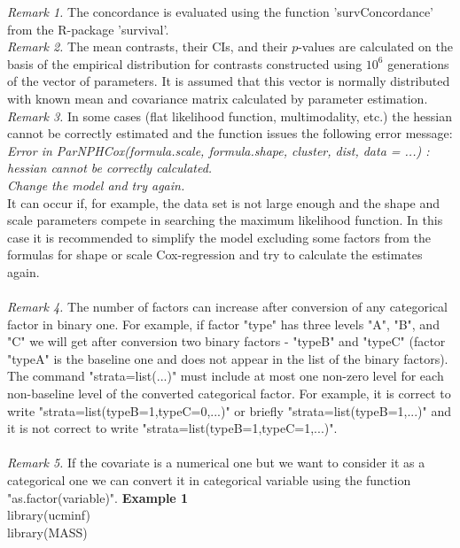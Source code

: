 \documentclass[A4document,12pt]{article}\usepackage[]{graphicx}\usepackage[]{color}
\begin{document}
\noindent
{\it{Remark 1.}} The concordance is evaluated using the function 'survConcordance' from the R-package 'survival'.\\
\noindent
{\it{Remark 2.}} The mean contrasts, their CIs, and their $p$-values are calculated on the basis of the empirical distribution for contrasts constructed using $10^6$ generations of the vector of parameters. It is assumed that this vector is normally distributed with known mean and covariance matrix calculated by parameter estimation. \\
\noindent
{\it{Remark 3.}} In some cases (flat likelihood function, multimodality, etc.) the hessian cannot be correctly estimated and the function issues the following error message: \\
{\it {Error in ParNPHCox(formula.scale, formula.shape, cluster, dist, data = ...) : \\
  hessian cannot be correctly calculated. \\
  Change the model and try again.}} \\
\noindent
It can occur if, for example, the data set is not large enough and the shape and scale parameters compete in searching the maximum likelihood function.  In this case it is recommended to simplify the model excluding some factors from the formulas for shape or scale Cox-regression and try to calculate the estimates again.\\\\
\noindent
{\it{Remark 4.}} The number of factors can increase after conversion of any categorical factor in binary one. For example, if factor "type" has three levels "A", "B", and "C" we will get after conversion two binary factors - "typeB" and "typeC" (factor "typeA" is the baseline one and does not appear in the list of the binary factors). The command "strata=list(...)" must include at most one non-zero level for each non-baseline level of the converted categorical factor. For example, it is correct to write "strata=list(typeB=1,typeC=0,...)" or briefly  "strata=list(typeB=1,...)"  and it is not correct to write "strata=list(typeB=1,typeC=1,...)".\\\\
\noindent
{\it{Remark 5.}} If the covariate is a numerical one but we want to consider it as a categorical one we can convert it in categorical variable using the function "as.factor(variable)".
\newpage
\noindent
\textbf{Example 1}\\
library(ucminf)\\
library(MASS)\\
\end{document}
